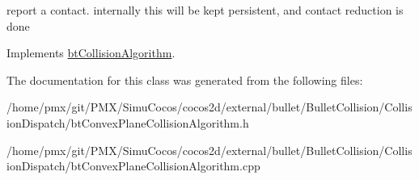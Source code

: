 report a contact. internally this will be kept persistent, and contact reduction is done 

Implements \hyperlink{classbtCollisionAlgorithm}{bt\+Collision\+Algorithm}.



The documentation for this class was generated from the following files\+:\begin{DoxyCompactItemize}
\item 
/home/pmx/git/\+P\+M\+X/\+Simu\+Cocos/cocos2d/external/bullet/\+Bullet\+Collision/\+Collision\+Dispatch/bt\+Convex\+Plane\+Collision\+Algorithm.\+h\item 
/home/pmx/git/\+P\+M\+X/\+Simu\+Cocos/cocos2d/external/bullet/\+Bullet\+Collision/\+Collision\+Dispatch/bt\+Convex\+Plane\+Collision\+Algorithm.\+cpp\end{DoxyCompactItemize}
